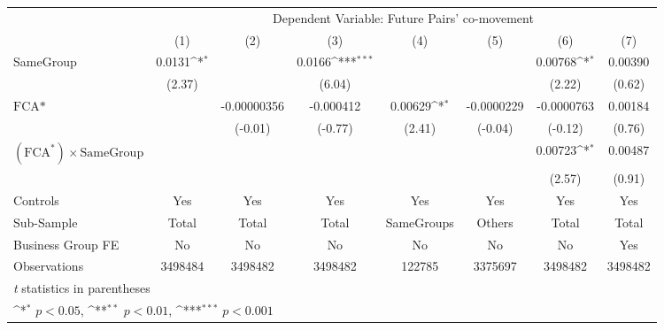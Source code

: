 {
\def\sym#1{\ifmmode^{#1}\else\(^{#1}\)\fi}
\begin{tabular}{l*{7}{c}}
\hline\hline
                &\multicolumn{7}{c}{Dependent Variable: Future Pairs' co-movement}                                                                   \\\cmidrule(lr){2-8}
                &\multicolumn{1}{c}{(1)}         &\multicolumn{1}{c}{(2)}         &\multicolumn{1}{c}{(3)}         &\multicolumn{1}{c}{(4)}         &\multicolumn{1}{c}{(5)}         &\multicolumn{1}{c}{(6)}         &\multicolumn{1}{c}{(7)}         \\
\hline
SameGroup       &   0.0131\sym{*}  &                  &   0.0166\sym{***}&                  &                  &  0.00768\sym{*}  &  0.00390         \\
                &   (2.37)         &                  &   (6.04)         &                  &                  &   (2.22)         &   (0.62)         \\
[1em]
$ \text{FCA*} $ &                  &-0.00000356         &-0.000412         &  0.00629\sym{*}  &-0.0000229         &-0.0000763         &  0.00184         \\
                &                  &  (-0.01)         &  (-0.77)         &   (2.41)         &  (-0.04)         &  (-0.12)         &   (0.76)         \\
[1em]
 $ (\text{FCA}^*) \times {\text{SameGroup} }  $ &                  &                  &                  &                  &                  &  0.00723\sym{*}  &  0.00487         \\
                &                  &                  &                  &                  &                  &   (2.57)         &   (0.91)         \\
\hline
Controls        &      Yes         &      Yes         &      Yes         &      Yes         &      Yes         &      Yes         &      Yes         \\
Sub-Sample      &    Total         &    Total         &    Total         &SameGroups         &   Others         &    Total         &    Total         \\
Business Group FE&       No         &       No         &       No         &       No         &       No         &       No         &      Yes         \\
Observations    &  3498484         &  3498482         &  3498482         &   122785         &  3375697         &  3498482         &  3498482         \\
\hline\hline
\multicolumn{8}{l}{\footnotesize \textit{t} statistics in parentheses}\\
\multicolumn{8}{l}{\footnotesize \sym{*} \(p<0.05\), \sym{**} \(p<0.01\), \sym{***} \(p<0.001\)}\\
\end{tabular}
}
